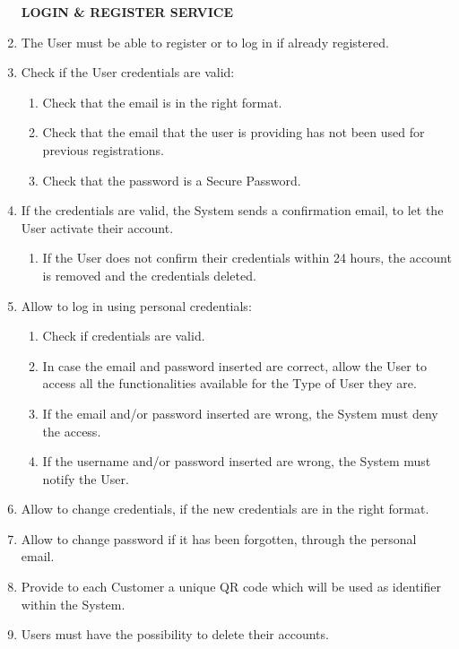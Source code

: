 \documentclass[a4paper, 12pt, oneside]{article}
\begin{document}
\begin{enumerate}[align=left, label={R.\arabic{*}}]
    \item[\textbf{LOGIN \& REGISTER SERVICE}]
    \item \label{req:logOrReg} The User must be able to register or to log in if already registered.
    \item \label{req:credentialsCheck} Check if the User credentials are valid:
    \begin{enumerate}[label={-}]
        \item \label{req:credentialsCheck:email} Check that the email is in the right format.
        \item \label{req:credentialsCheck:uniqueness} Check that the email that the user is providing has not been used for previous registrations.
        \item \label{req:credentialsCheck:password}Check that the password is a Secure Password.
    \end{enumerate}
    \item \label{req:confirmRegistration}If the credentials are valid, the System sends a confirmation email, to let the User activate their account.
    \begin{enumerate}[label={-}]
        \item \label{req:confirmRegistration:timeout}If the User does not confirm their credentials within 24 hours, the account is removed and the credentials deleted.
    \end{enumerate}
    \item \label{req:login} Allow to log in using personal credentials:
    \begin{enumerate}[label={-}]
        \item \label{req:login:checkCred}Check if credentials are valid.
        \item \label{req:login:validCred} In case the email and password inserted are correct, allow the User to access all the functionalities available for the Type of User they are.
        \item \label{req:login:invalidCred} If the email and/or password inserted are wrong, the System must deny the access.
        \item If the username and/or password inserted are wrong, the System must notify the User. 
    \end{enumerate}
    \item \label{req:changeCredentials} Allow to change credentials, if the new credentials are in the right format.
    \item \label{req:changePassWithMail}Allow to change password if it has been forgotten, through the personal email.
    \item \label{req:provideQR} Provide to each Customer a unique QR code which will be used as identifier within the System.
    \item \label{req:deleteAccount} Users must have the possibility to delete their accounts.
    

\end{enumerate}
\end{document}
